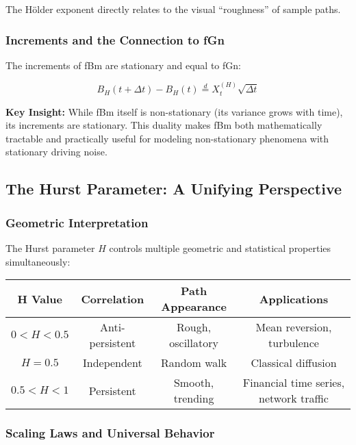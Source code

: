 \documentclass[11pt,a4paper]{article}
\begin{document}
The Hölder exponent directly relates to the visual ``roughness'' of sample paths.

\subsubsection{Increments and the Connection to fGn}

The increments of fBm are stationary and equal to fGn:

\begin{equation}
B_H(t+\Delta t) - B_H(t) \stackrel{d}{=} X_t^{(H)} \sqrt{\Delta t}
\end{equation}

\textbf{Key Insight:} While fBm itself is non-stationary (its variance grows with time), its increments are stationary. This duality makes fBm both mathematically tractable and practically useful for modeling non-stationary phenomena with stationary driving noise.

\subsection{The Hurst Parameter: A Unifying Perspective}

\subsubsection{Geometric Interpretation}

The Hurst parameter $H$ controls multiple geometric and statistical properties simultaneously:

\begin{center}
\begin{tabular}{|c|c|c|c|}
\hline
\textbf{H Value} & \textbf{Correlation} & \textbf{Path Appearance} & \textbf{Applications} \\
\hline
$0 < H < 0.5$ & Anti-persistent & Rough, oscillatory & Mean reversion, turbulence \\
$H = 0.5$ & Independent & Random walk & Classical diffusion \\
$0.5 < H < 1$ & Persistent & Smooth, trending & Financial time series, network traffic \\
\hline
\end{tabular}
\end{center}

\subsubsection{Scaling Laws and Universal Behavior}
\end{document}
